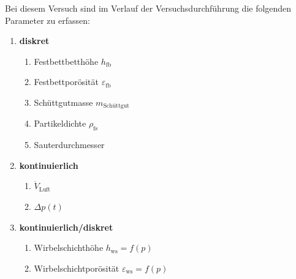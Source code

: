 Bei diesem Versuch sind im Verlauf der Versuchsdurchführung die folgenden Parameter zu erfassen:

\begin{enumerate}[label = \textbullet, itemsep = -.1em]
\item \textbf{diskret}
	\begin{enumerate}[label = --, itemsep = -.1em]
		\item Festbettbetthöhe $h_{\mathrm{fb}}$
		\item Festbettporösität $\varepsilon_{\mathrm{fb}}$
		\item Schüttgutmasse $m_{\mathrm{Schüttgut}}$
		\item Partikeldichte $\rho_{\mathrm{fs}}$
		\item Sauterdurchmesser
	\end{enumerate}  	
	
\item \textbf{kontinuierlich}
	\begin{enumerate}[label = --, itemsep = -.1em]
		\item $\dot{V}_{\mathrm{Luft}}$ 
		\item $\Delta p (t)$ 
	\end{enumerate} 
	
\item \textbf{kontinuierlich/diskret}
	\begin{enumerate}[label = --, itemsep = -.1em]
		\item Wirbelschichthöhe $h_{\mathrm{ws}} = f(p)$
		\item Wirbelschichtporösität $\varepsilon_{\mathrm{ws}}= f(p)$ 
	\end{enumerate} 
	
\end{enumerate} 

